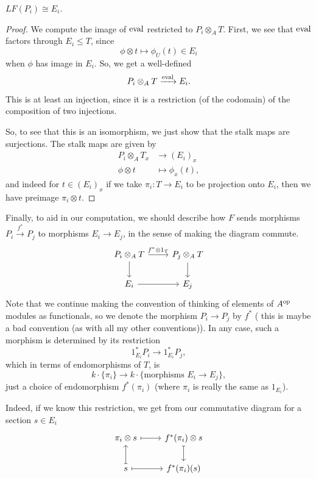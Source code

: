 \documentclass[12pt]{article}
\begin{document}
\begin{prop}
    $LF(P_i) \cong E_i$.
\end{prop}
\begin{proof}
    We compute the image of $\mathrm{eval}$ restricted to $P_i \otimes_A T$. First, we see that $\mathrm{eval}$ factors through $E_i \leq T$, since
    \[\phi \otimes t \mapsto \phi_U(t) \in E_i\]
    when $\phi$ has image in $E_i$. So, we get a well-defined
    \[P_i \otimes_A T \xrightarrow{\mathrm{eval}} E_i.\]
    This is at least an injection, since it is a restriction (of the codomain) of the composition of two injections.
    
    So, to see that this is an isomorphism, we just show that the stalk maps are surjections. The stalk maps are given by
    \begin{align*}
        P_i \otimes_A T_x &\longrightarrow (E_i)_x\\
        \phi \otimes t &\longmapsto \phi_x(t),
    \end{align*}
    and indeed for $t\in (E_i)_x$ if we take $\pi_i:T\to E_i$ to be projection onto $E_i$, then we have preimage $\pi_i \otimes t$.
\end{proof}

Finally, to aid in our computation, we should describe how $F$ sends morphisms $P_i \xrightarrow{f^*} P_j$ to morphisms $E_i \to E_j$, in the sense of making the diagram commute.
\[\begin{tikzcd}
    P_i \otimes_A T \rar["f^*\otimes 1_T"] \dar & P_j \otimes_A T \dar\\
    E_i \rar & E_j
\end{tikzcd}\]
Note that we continue making the convention of thinking of elements of $A^{\mathrm{op}}$ modules as functionals, so we denote the morphism $P_i\to P_j$ by $f^*$ ({\color{red} this is maybe a bad convention (as with all my other conventions)}). In any case, such a morphism is determined by its restriction
\[1_{E_i}^* P_i \longrightarrow 1_{E_i}^* P_j,\]
which in terms of endomorphisms of $T$, is
\[k\cdot \{\pi_i\} \longrightarrow k\cdot \{\text{morphisms $E_i \to E_j$}\},\]
just a choice of endomorphism $f^*(\pi_i)$ (where $\pi_i$ is really the same as $1_{E_i}$).

Indeed, if we know this restriction, we get from our commutative diagram for a section $s\in E_i$
\[\begin{tikzcd}
    \pi_i \otimes s \rar[mapsto] & f^*(\pi_i) \otimes s \dar[mapsto]\\
    s \uar[mapsto] \rar[mapsto] & f^*(\pi_i)(s)
\end{tikzcd}\]
\end{document}
